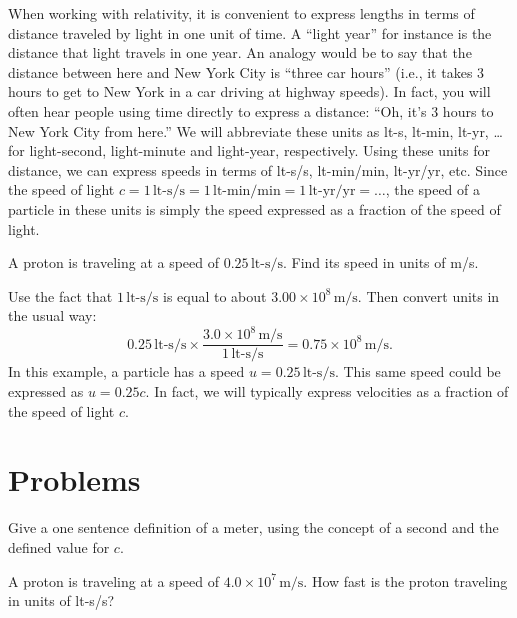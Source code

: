 When working with relativity, it is convenient to express lengths in
terms of distance traveled by light in one unit of time.  A ``light
year'' for instance is the distance that light travels in one year.
An analogy would be to say that the distance between here and New York
City is ``three car hours'' (i.e., it takes 3 hours to get to New York
in a car driving at highway speeds).  In fact, you will often hear
people using time directly to express a distance: ``Oh, it's 3 hours
to New York City from here.''  We will abbreviate these units as lt-s,
lt-min, lt-yr, \dots for light-second, light-minute and light-year,
respectively. Using these units for distance, we can express speeds in
terms of lt-s/s, lt-min/min, lt-yr/yr, etc.  Since the speed of light
$c = 1 \,\text{lt-s/s} = 1 \,\text{lt-min/min} = 1 \,\text{lt-yr/yr} =
\dots$, the speed of a particle in these units is simply the speed
expressed as a fraction of the speed of light.
   
\begin{example}
  A proton is traveling at a speed of $0.25\,\text{lt-s/s}$.  Find its speed in
  units of m/s.  

\solution Use the fact that $1\,\text{lt-s/s}$ is equal to
  about $3.00\times 10^8\,\text{m/s}$.  Then convert units in the
  usual way:
\[ 0.25\,\text{lt-s/s} \times 
        \frac{3.0\times 10^8\,\text{m/s}}{1\,\text{lt-s/s}}
       = 0.75\times 10^8\,\text{m/s}.  \]
In this example, a particle has a speed $u = 0.25\,\text{lt-s/s}$.  This same
speed could be expressed as $u = 0.25c$.  In fact, we will typically
express velocities as a fraction of the speed of light $c$.
\end{example}



\section*{Problems}

\begin{exercise}
Give a one sentence definition of a meter, using the concept of
a second and the defined value for $c$.  
\end{exercise}

\begin{exercise}
A proton is traveling at a speed of $4.0 \times 10^7\,\text{m/s}$.  
How fast is the proton traveling in units of lt-s/s?
\label{prob:rel_units}
\end{exercise}

